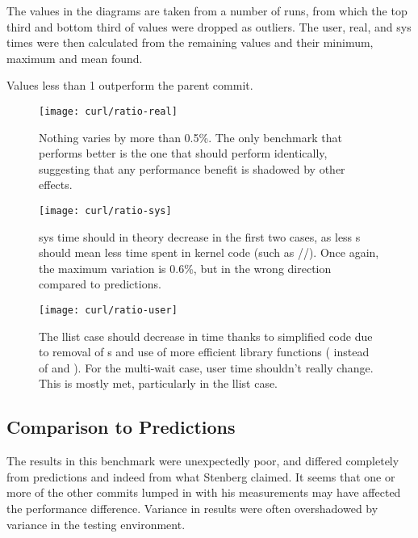 The values in the diagrams are taken from a number of runs, from which the top third and bottom third of values were dropped as outliers. The user, real, and sys times were then calculated from the remaining values and their minimum, maximum and mean found.

Values less than 1 outperform the parent commit.

\begin{figure}[h]
	\centering
	\texttt{[image: curl/ratio-real]}
	\caption{Nothing varies by more than 0.5\%. The only benchmark that performs better is the one that should perform identically, suggesting that any performance benefit is shadowed by other effects.}\label{firstcurl}
\end{figure}

\begin{figure}[p]
	\centering
	\texttt{[image: curl/ratio-sys]}
	\caption{sys time should in theory decrease in the first two cases, as less \malloc{}s should mean less time spent in kernel code (such as //). Once again, the maximum variation is 0.6\%, but in the wrong direction compared to predictions.}
\end{figure}

\begin{figure}[p]
	\centering
	\texttt{[image: curl/ratio-user]}
	\caption{The llist case should decrease in time thanks to simplified code due to removal of \malloc{}s and use of more efficient library functions ( instead of \malloc{} and ). For the multi-wait case, user time shouldn't really change. This is mostly met, particularly in the llist case.}\label{lastcurl}
\end{figure}

\subsection{Comparison to Predictions}

The results in this benchmark were unexpectedly poor, and differed completely from predictions and indeed from what Stenberg claimed. It seems that one or more of the other commits lumped in with his measurements may have affected the performance difference. Variance in results were often overshadowed by variance in the testing environment.
